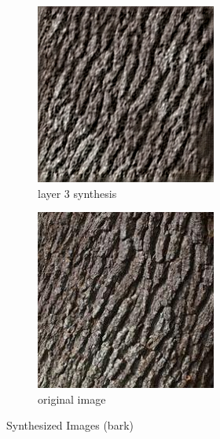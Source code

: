 \documentclass[11pt, oneside]{article}   	%
\begin{document}
\begin{figure}[H]
    \begin{subfigure}[b]{0.45\textwidth}
        \includegraphics[width=\textwidth]{figure/bark/layer_03_001}
        \caption{layer 3 synthesis}
    \end{subfigure}
        \begin{subfigure}[b]{0.45\textwidth}
        \includegraphics[width=\textwidth]{figure/bark/layer_00_001}
        \caption{original image}
    \end{subfigure}
    \caption{Synthesized Images (bark)}\label{fig:barks}
\end{figure}
\end{document}
